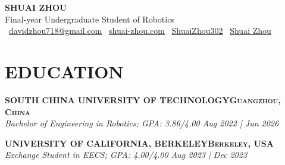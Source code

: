 \documentclass[a4paper,9pt]{extarticle}
\begin{document}
\pagestyle{fancy}
\renewcommand{\headrulewidth}{0pt}
\fancyhead{}
\thispagestyle{empty} %

\begin{center}
{\fontsize{24pt}{36pt}\selectfont\textbf{SHUAI ZHOU}}\\[3pt] %
Final-year Undergraduate Student of Robotics \\[2pt]
\faEnvelope\ \href{mailto:davidzhou718@gmail.com}{davidzhou718@gmail.com}
\quad \textbar{} \quad
\faHome\ \href{https://www.shuai-zhou.com}{shuai-zhou.com}
\quad \textbar{} \quad
\faGithub\ \href{https://github.com/ShuaiZhou302}{ShuaiZhou302}
\quad \textbar{} \quad
\faGraduationCap\ \href{https://scholar.google.com/citations?user=ONn1TXAAAAAJ&hl=en&oi=sra}{Shuai Zhou}
\end{center}

\section*{{\textbf{\fontsize{14pt}{8pt}\selectfont E}\textbf{\scshape DUCATION}}}
{\textbf{\fontsize{12pt}{4pt}\selectfont S}\textbf{\scshape OUTH CHINA UNIVERSITY OF TECHNOLOGY\hfill Guangzhou, China}}\\ %
\textit{Bachelor of Engineering in Robotics; GPA: 3.86/4.00  \hfill Aug 2022 | Jun 2026} 
\par\vspace{4pt}\noindent
{\textbf{\fontsize{12pt}{4pt}\selectfont U}\textbf{\scshape NIVERSITY OF CALIFORNIA, BERKELEY\hfill Berkeley, USA}}\\ %
\textit{Exchange Student in EECS; GPA: 4.00/4.00 \hfill   Aug 2023 | Dec 2023} %
\end{document}

